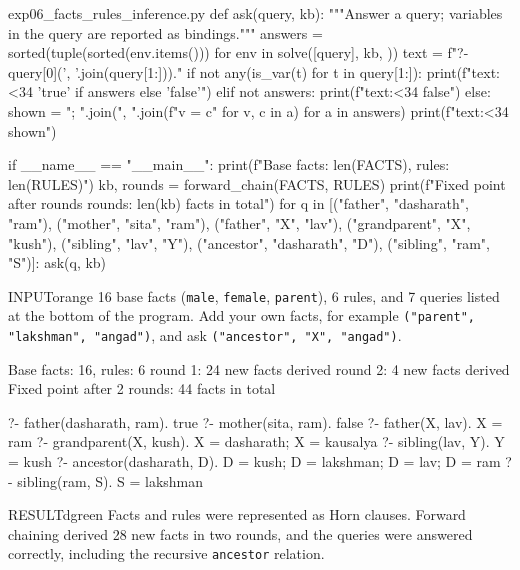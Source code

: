 \documentclass[11pt,a4paper]{article}
\newenvironment{inputbox}{\begin{secbox}{INPUT}{orange}}{\end{secbox}}
\newenvironment{result}{\begin{secbox}{RESULT}{dgreen}}{\end{secbox}}
\begin{document}
\begin{pycode}{exp06\_facts\_rules\_inference.py}
def ask(query, kb):
    """Answer a query; variables in the query are reported as bindings."""
    answers = sorted({tuple(sorted(env.items()))
                      for env in solve([query], kb, {})})
    text = f"?- {query[0]}({', '.join(query[1:])})."
    if not any(is_var(t) for t in query[1:]):
        print(f"{text:<34} {'true' if answers else 'false'}")
    elif not answers:
        print(f"{text:<34} false")
    else:
        shown = "; ".join(", ".join(f"{v} = {c}" for v, c in a) for a in answers)
        print(f"{text:<34} {shown}")


if __name__ == "__main__":
    print(f"Base facts: {len(FACTS)}, rules: {len(RULES)}")
    kb, rounds = forward_chain(FACTS, RULES)
    print(f"Fixed point after {rounds} rounds: {len(kb)} facts in total\n")
    for q in [("father", "dasharath", "ram"),
              ("mother", "sita", "ram"),
              ("father", "X", "lav"),
              ("grandparent", "X", "kush"),
              ("sibling", "lav", "Y"),
              ("ancestor", "dasharath", "D"),
              ("sibling", "ram", "S")]:
        ask(q, kb)
\end{pycode}

\begin{inputbox}
16 base facts (\texttt{male}, \texttt{female}, \texttt{parent}), 6 rules, and 7 queries listed at the bottom of the program. Add your own facts, for example \texttt{("parent", "lakshman", "angad")}, and ask \texttt{("ancestor", "X", "angad")}.
\end{inputbox}

\begin{outputbox}
Base facts: 16, rules: 6
   round 1: 24 new facts derived
   round 2: 4 new facts derived
Fixed point after 2 rounds: 44 facts in total

?- father(dasharath, ram).         true
?- mother(sita, ram).              false
?- father(X, lav).                 X = ram
?- grandparent(X, kush).           X = dasharath; X = kausalya
?- sibling(lav, Y).                Y = kush
?- ancestor(dasharath, D).         D = kush; D = lakshman; D = lav; D = ram
?- sibling(ram, S).                S = lakshman
\end{outputbox}

\begin{result}
Facts and rules were represented as Horn clauses. Forward chaining derived 28 new facts in two rounds, and the queries were answered correctly, including the recursive \texttt{ancestor} relation.
\end{result}
\end{document}
